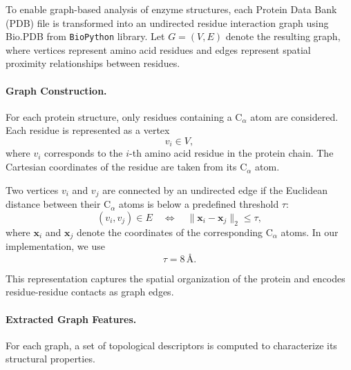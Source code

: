 \documentclass[runningheads]{llncs}
\begin{document}
To enable graph-based analysis of enzyme structures, each Protein Data Bank (PDB) file is transformed into an undirected residue interaction graph using Bio.PDB from \texttt{BioPython} library. Let $G=(V,E)$ denote the resulting graph, where vertices represent amino acid residues and edges represent spatial proximity relationships between residues.

\paragraph{Graph Construction.}
For each protein structure, only residues containing a C$_\alpha$ atom are considered. Each residue is represented as a vertex
\[
v_i \in V,
\]
where $v_i$ corresponds to the $i$-th amino acid residue in the protein chain. The Cartesian coordinates of the residue are taken from its C$_\alpha$ atom.

Two vertices $v_i$ and $v_j$ are connected by an undirected edge if the Euclidean distance between their C$_\alpha$ atoms is below a predefined threshold $\tau$:
\[
(v_i,v_j)\in E
\quad \Longleftrightarrow \quad
\|\mathbf{x}_i-\mathbf{x}_j\|_2 \leq \tau ,
\]
where $\mathbf{x}_i$ and $\mathbf{x}_j$ denote the coordinates of the corresponding C$_\alpha$ atoms. In our implementation, we use
\[
\tau = 8 \, \text{\AA}.
\]

This representation captures the spatial organization of the protein and encodes residue-residue contacts as graph edges.

\paragraph{Extracted Graph Features.}
For each graph, a set of topological descriptors is computed to characterize its structural properties.
\end{document}
